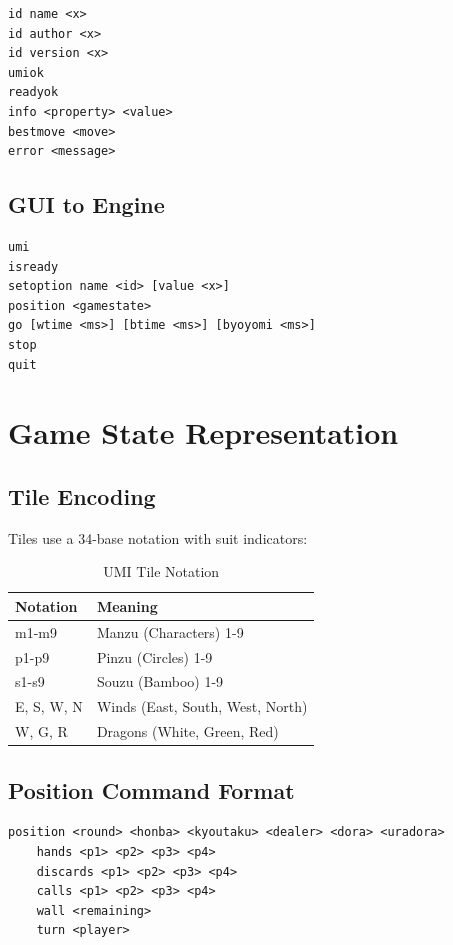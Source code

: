 \documentclass[11pt,a4paper]{article}
\begin{document}
\begin{lstlisting}
id name <x>
id author <x>
id version <x>
umiok
readyok
info <property> <value>
bestmove <move>
error <message>
\end{lstlisting}

\subsection{GUI to Engine}

\begin{lstlisting}
umi
isready
setoption name <id> [value <x>]
position <gamestate>
go [wtime <ms>] [btime <ms>] [byoyomi <ms>]
stop
quit
\end{lstlisting}

\section{Game State Representation}

\subsection{Tile Encoding}

Tiles use a 34-base notation with suit indicators:

\begin{table}[h]
\centering
\begin{tabular}{ll}
\toprule
\textbf{Notation} & \textbf{Meaning} \\
\midrule
m1-m9 & Manzu (Characters) 1-9 \\
p1-p9 & Pinzu (Circles) 1-9 \\
s1-s9 & Souzu (Bamboo) 1-9 \\
E, S, W, N & Winds (East, South, West, North) \\
W, G, R & Dragons (White, Green, Red) \\
\bottomrule
\end{tabular}
\caption{UMI Tile Notation}
\end{table}

\subsection{Position Command Format}

\begin{lstlisting}
position <round> <honba> <kyoutaku> <dealer> <dora> <uradora>
    hands <p1> <p2> <p3> <p4>
    discards <p1> <p2> <p3> <p4>
    calls <p1> <p2> <p3> <p4>
    wall <remaining>
    turn <player>
\end{lstlisting}
\end{document}
